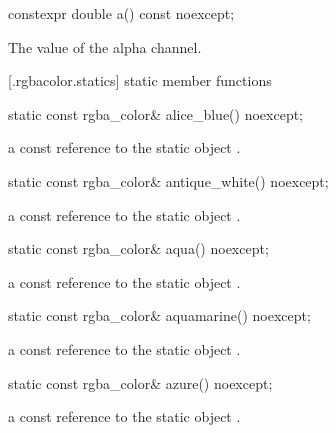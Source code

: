 \begin{itemdecl}
constexpr double a() const noexcept;
\end{itemdecl}
\begin{itemdescr}
\pnum
\returns
The value of the alpha channel.
\end{itemdescr}

 [\iotwod.rgbacolor.statics] { static member functions}

\begin{itemdecl}
static const rgba_color& alice_blue() noexcept;
\end{itemdecl}
\begin{itemdescr}
\pnum
\returns
a const reference to the static  object .
\end{itemdescr}

\begin{itemdecl}
static const rgba_color& antique_white() noexcept;
\end{itemdecl}
\begin{itemdescr}
\pnum
\returns
a const reference to the static  object .
\end{itemdescr}

\begin{itemdecl}
static const rgba_color& aqua() noexcept;
\end{itemdecl}
\begin{itemdescr}
\pnum
\returns
a const reference to the static  object .
\end{itemdescr}

\begin{itemdecl}
static const rgba_color& aquamarine() noexcept;
\end{itemdecl}
\begin{itemdescr}
\pnum
\returns
a const reference to the static  object .
\end{itemdescr}

\begin{itemdecl}
static const rgba_color& azure() noexcept;
\end{itemdecl}
\begin{itemdescr}
\pnum
\returns
a const reference to the static  object .
\end{itemdescr}

